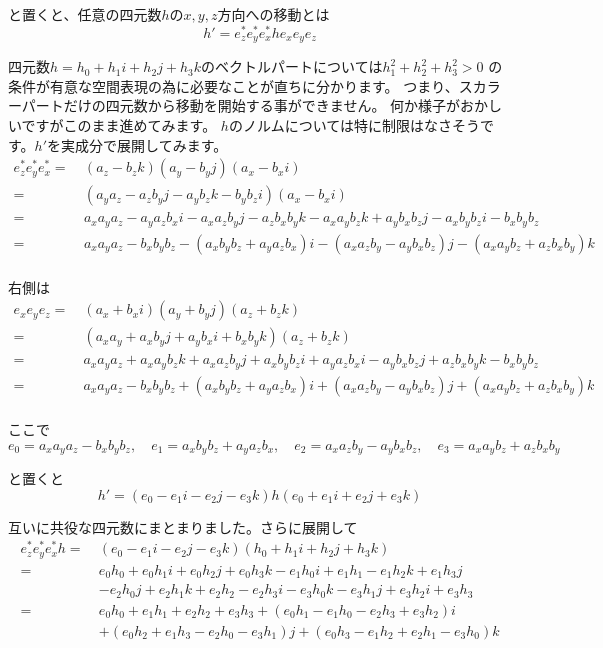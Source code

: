 \documentclass[a4paper,12pt,notitlepage]{jsreport}
\begin{document}
と置くと、任意の四元数$h$の$x,y,z$方向への移動とは
\begin{equation}
  h'=e_z^*e_y^*e_x^*he_xe_ye_z
\end{equation}

四元数$h=h_0+h_1i+h_2j+h_3k$のベクトルパートについては$h_1^2+h_2^2+h_3^2>0$
の条件が有意な空間表現の為に必要なことが直ちに分かります。
つまり、スカラーパートだけの四元数から移動を開始する事ができません。
何か様子がおかしいですがこのまま進めてみます。
$h$のノルムについては特に制限はなさそうです。$h'$を実成分で展開してみます。
\begin{equation}
  \begin{split}
    e_z^*e_y^*e_x^*=~&(a_z-b_zk)(a_y-b_yj)(a_x-b_xi)\\
    =~&(a_ya_z-a_zb_yj-a_yb_zk-b_yb_zi)(a_x-b_xi)\\
    =~&a_xa_ya_z-a_ya_zb_xi-a_xa_zb_yj-a_zb_xb_yk-a_xa_yb_zk+a_yb_xb_zj-a_xb_yb_zi-b_xb_yb_z\\
    =~&a_xa_ya_z-b_xb_yb_z-(a_xb_yb_z+a_ya_zb_x)i-(a_xa_zb_y-a_yb_xb_z)j-(a_xa_yb_z+a_zb_xb_y)k\\
  \end{split}
\end{equation}

右側は
\begin{equation}
  \begin{split}
    e_xe_ye_z=~&(a_x+b_xi)(a_y+b_yj)(a_z+b_zk)\\
    =~&(a_xa_y+a_xb_yj+a_yb_xi+b_xb_yk)(a_z+b_zk)\\
    =~&a_xa_ya_z+a_xa_yb_zk+a_xa_zb_yj+a_xb_yb_zi+a_ya_zb_xi-a_yb_xb_zj+a_zb_xb_yk-b_xb_yb_z\\
    =~&a_xa_ya_z-b_xb_yb_z+(a_xb_yb_z+a_ya_zb_x)i+(a_xa_zb_y-a_yb_xb_z)j+(a_xa_yb_z+a_zb_xb_y)k\\
  \end{split}
\end{equation}

ここで
\begin{equation}
  e_0=a_xa_ya_z-b_xb_yb_z,\quad e_1=a_xb_yb_z+a_ya_zb_x,\quad e_2=a_xa_zb_y-a_yb_xb_z,\quad e_3=a_xa_yb_z+a_zb_xb_y
\end{equation}

と置くと
\begin{equation}
  h'=(e_0-e_1i-e_2j-e_3k)h(e_0+e_1i+e_2j+e_3k)
\end{equation}

互いに共役な四元数にまとまりました。さらに展開して
\begin{equation}
  \begin{split}
    e_z^*e_y^*e_x^*h=~&(e_0-e_1i-e_2j-e_3k)(h_0+h_1i+h_2j+h_3k)\\
    =~&e_0h_0+e_0h_1i+e_0h_2j+e_0h_3k-e_1h_0i+e_1h_1-e_1h_2k+e_1h_3j\\
    &-e_2h_0j+e_2h_1k+e_2h_2-e_2h_3i-e_3h_0k-e_3h_1j+e_3h_2i+e_3h_3\\
    =~&e_0h_0+e_1h_1+e_2h_2+e_3h_3+(e_0h_1-e_1h_0-e_2h_3+e_3h_2)i\\
    &+(e_0h_2+e_1h_3-e_2h_0-e_3h_1)j+(e_0h_3-e_1h_2+e_2h_1-e_3h_0)k\\
  \end{split}
\end{equation}
\end{document}
